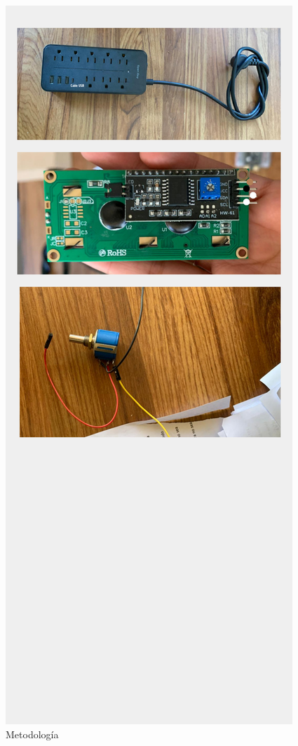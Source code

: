     \begin{figure}[H]
        \centering
        \includegraphics[trim = {5mm 180mm 5mm 30mm},clip,scale=0.4]{16/Img/instructivoCE(4).pdf}
        \caption{Metodología}
        \label{fig:InstructivoCE4}
    \end{figure}

